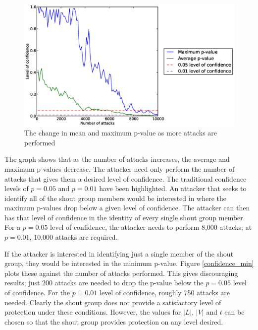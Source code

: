 \documentclass[ %
                    author={Luke Murray},
                supervisor={Dr. Simon Hollis},
                     title={Shadow Peer-to-Peer Networks},
                  subtitle={},
                    degree={MEng},
                      year={2013} ]{thesis}
\begin{document}
\begin{figure}[h]
    \centering
    \begin{minipage}[b]{0.8\linewidth}
        \centering
        \includegraphics[width=\linewidth]{diagrams/confidence.eps}
        \caption{The change in mean and maximum p-value as more attacks are performed}
    \end{minipage}
    \label{confidence}
\end{figure}

The graph shows that as the number of attacks increases, the average and maximum p-values decrease. The attacker need only perform the number of attacks that gives them a desired level of confidence. The traditional confidence levels of $p = 0.05$ and $p = 0.01$ have been highlighted. An attacker that seeks to identify all of the shout group members would be interested in where the maximum p-values drop below a given level of confidence. The attacker can then has that level of confidence in the identity of every single shout group member. For a $p = 0.05$ level of confidence, the attacker needs to perform 8,000 attacks; at $p = 0.01$, 10,000 attacks are required.

If the attacker is interested in identifying just a single member of the shout group, they would be interested in the minimum p-value. Figure \ref{confidence_min} plots these against the number of attacks performed. This gives discouraging results; just 200 attacks are needed to drop the p-value below the $p = 0.05$ level of confidence. For the $p = 0.01$ level of confidence, roughly 750 attacks are needed. Clearly the shout group does not provide a satisfactory level of protection under these conditions. However, the values for $|L|$, $|V|$ and $t$ can be chosen so that the shout group provides protection on any level desired.
\end{document}
